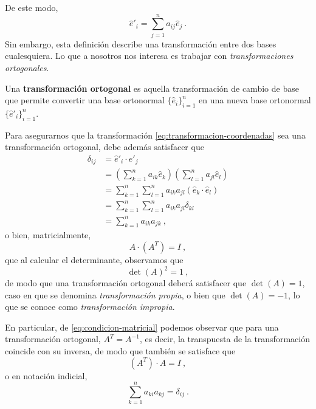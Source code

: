 De este modo, 
\begin{equation} \label{eq:transformacion-coordenadas}
    \hat{e}'_i = \sum_{j=1}^n a_{ij} \hat{e}_j \ .
\end{equation}
Sin embargo, esta definición describe una transformación entre dos bases cualesquiera. Lo que a nosotros nos interesa es trabajar con \emph{transformaciones ortogonales}.

\begin{defi}
    Una \textbf{transformación ortogonal} es aquella transformación de cambio de base que permite convertir una base ortonormal $\{\hat{e}_i\}_{i=1}^n$ en una nueva base ortonormal $\{\hat{e}'_i\}_{i=1}^n$.
\end{defi}

Para asegurarnos que la transformación \eqref{eq:transformacion-coordenadas} sea una transformación ortogonal, debe además satisfacer que
\begin{align}
    \delta_{ij} & = \hat{e}'_i \cdot \hat{e}'_j \\
    & = \left( \sum_{k=1}^n a_{ik} \hat{e}_k \right) \left( \sum_{l=1}^n a_{jl} \hat{e}_l \right) \\
    & = \sum_{k=1}^n \sum_{l=1}^n a_{ik} a_{jl} (\hat{e}_k \cdot \hat{e}_l) \\
    & = \sum_{k=1}^n \sum_{l=1}^n a_{ik} a_{jl} \delta_{kl} \\
    & = \sum_{k=1}^n a_{ik} a_{jk} \ , \label{eq:delta-transformacion-ortogonal}
\end{align}
o bien, matricialmente,
\begin{equation}\label{eq:condicion-matricial}
    A \cdot (A^T) = I \ ,
\end{equation}
que al calcular el determinante, observamos que
\begin{equation}
    \det(A)^2 = 1 \ , 
\end{equation}
de modo que una transformación ortogonal deberá satisfacer que $\det(A) = 1$, caso en que se denomina \emph{transformación propia}, o bien que $\det(A) = -1$, lo que se conoce como \emph{transformación impropia}.

En particular, de \eqref{eq:condicion-matricial} podemos observar que para una transformación ortogonal, $A^T = A^{-1}$, es decir, la transpuesta de la transformación coincide con su inversa, de modo que también se satisface que
\begin{equation}
    (A^T) \cdot A = I \ ,
\end{equation}
o en notación indicial,
\begin{equation}
    \sum_{k=1}^n a_{ki} a_{kj} =  \delta_{ij} \ .
\end{equation}

